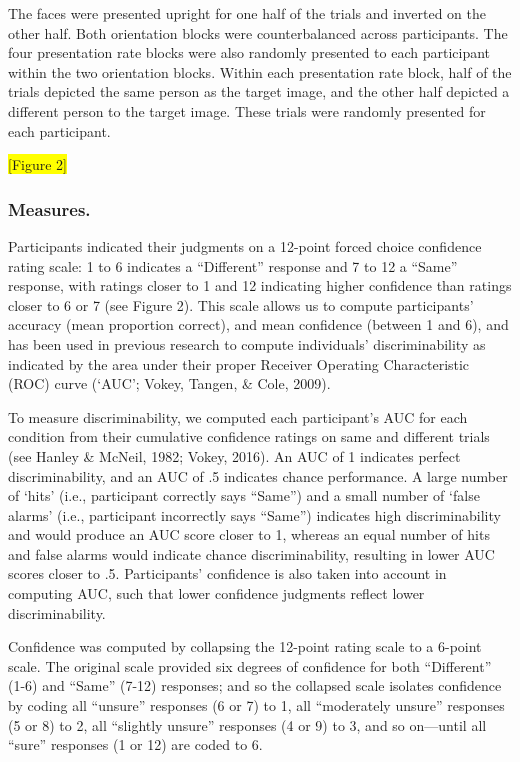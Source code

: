 \documentclass[
  english,
  man]{apa6}
\begin{document}
The faces were presented upright for one half of the trials and inverted on the other half. Both orientation blocks were counterbalanced across participants. The four presentation rate blocks were also randomly presented to each participant within the two orientation blocks. Within each presentation rate block, half of the trials depicted the same person as the target image, and the other half depicted a different person to the target image. These trials were randomly presented for each participant.

\colorbox{yellow}{[Figure 2]}

\hypertarget{measures.}{%
\subsubsection{Measures.}\label{measures.}}

Participants indicated their judgments on a 12-point forced choice confidence rating scale: 1 to 6 indicates a ``Different'' response and 7 to 12 a ``Same'' response, with ratings closer to 1 and 12 indicating higher confidence than ratings closer to 6 or 7 (see Figure 2). This scale allows us to compute participants' accuracy (mean proportion correct), and mean confidence (between 1 and 6), and has been used in previous research to compute individuals' discriminability as indicated by the area under their proper Receiver Operating Characteristic (ROC) curve (`AUC'; Vokey, Tangen, \& Cole, 2009).

To measure discriminability, we computed each participant's AUC for each condition from their cumulative confidence ratings on same and different trials (see Hanley \& McNeil, 1982; Vokey, 2016). An AUC of 1 indicates perfect discriminability, and an AUC of .5 indicates chance performance. A large number of `hits' (i.e., participant correctly says ``Same'') and a small number of `false alarms' (i.e., participant incorrectly says ``Same'') indicates high discriminability and would produce an AUC score closer to 1, whereas an equal number of hits and false alarms would indicate chance discriminability, resulting in lower AUC scores closer to .5. Participants' confidence is also taken into account in computing AUC, such that lower confidence judgments reflect lower discriminability.

Confidence was computed by collapsing the 12-point rating scale to a 6-point scale. The original scale provided six degrees of confidence for both ``Different'' (1-6) and ``Same'' (7-12) responses; and so the collapsed scale isolates confidence by coding all ``unsure'' responses (6 or 7) to 1, all ``moderately unsure'' responses (5 or 8) to 2, all ``slightly unsure'' responses (4 or 9) to 3, and so on---until all ``sure'' responses (1 or 12) are coded to 6.
\end{document}
